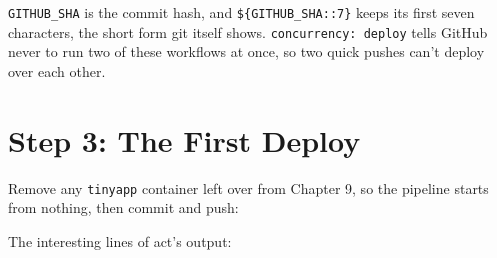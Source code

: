 \begin{codeblock}
\begin{Shaded}
\begin{Highlighting}[]
\AttributeTok{  }\KeywordTok{:}
\AttributeTok{    }\KeywordTok{:}
\AttributeTok{    }\KeywordTok{:}
\AttributeTok{    }\KeywordTok{:}
\AttributeTok{      }\KeywordTok{{-}}\AttributeTok{ }\KeywordTok{:}
\AttributeTok{      }\KeywordTok{{-}}\AttributeTok{ }\KeywordTok{:}
\AttributeTok{        }\KeywordTok{:}
\end{Highlighting}
\end{Shaded}

\end{codeblock}

\texttt{GITHUB\_SHA} is the commit hash, and \texttt{\$\{GITHUB\_SHA::7\}} keeps its first seven characters, the short form git itself shows. \texttt{concurrency:\ deploy} tells GitHub never to run two of these workflows at once, so two quick pushes can't deploy over each other.


\section{Step 3: The First Deploy}\label{10-lab-deploy-on-every-push:step-3-the-first-deploy}

Remove any \texttt{tinyapp} container left over from Chapter 9, so the pipeline starts from nothing, then commit and push:

\begin{codeblock}

\begin{Shaded}
\begin{Highlighting}[]
 
\end{Highlighting}
\end{Shaded}

\end{codeblock}


The interesting lines of act's output:

